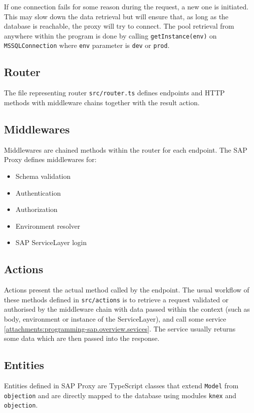 If one connection fails for some reason during the request, a new one is initiated.
This may slow down the data retrieval but will ensure that, as long as the database is reachable, the proxy will try to connect.
The pool retrieval from anywhere within the program is done by calling \texttt{getInstance(env)} on \texttt{MSSQLConnection} where \texttt{env} parameter is \texttt{dev} or \texttt{prod}.

\subsection{Router}
The file representing router \texttt{src/router.ts} defines endpoints and HTTP methods with middleware chains together with the result action.

\subsection{Middlewares}
Middlewares are chained methods within the router for each endpoint.
The SAP Proxy defines middlewares for:
\begin{itemize}
    \item Schema validation
    \item Authentication
    \item Authorization
    \item Environment resolver
    \item SAP ServiceLayer login
\end{itemize}

\subsection{Actions}
Actions present the actual method called by the endpoint.
The usual workflow of these methods defined in \texttt{src/actions} is to retrieve a request validated or authorised by the middleware chain with data passed within the context (such as body, environment or instance of the ServiceLayer), and call some service \ref{attachments:programming-sap.overview.sevices}.
The service usually returns some data which are then passed into the response.

\subsection{Entities}
Entities defined in SAP Proxy are TypeScript classes that extend \texttt{Model} from \texttt{objection} and are directly mapped to the database using modules \texttt{knex} and \texttt{objection}.

